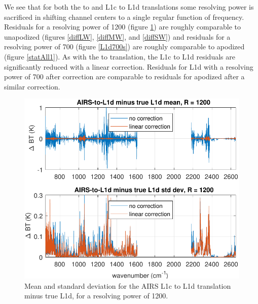 \documentclass[journal]{IEEEtran}
\begin{document}
We see that for both the {\airs} to {\cris} and L1c to L1d
translations some resolving power is sacrificed in shifting channel
centers to a single regular function of frequency.  Residuals for a
resolving power of 1200 (figure \ref{L1d1200}) are roughly
comparable to unapodized {\cris} (figures \ref{diffLW},
\ref{diffMW}, and \ref{diffSW}) and residuals for a resolving power
of 700 (figure \ref{L1d700s}) are roughly comparable to apodized
{\cris} (figure \ref{statAll1}).  As with the {\airs} to {\cris}
translation, the L1c to L1d residuals are significantly reduced with
a linear correction.  Residuals for L1d with a resolving power of
700 after correction are comparable to residuals for apodized
{\cris} after a similar correction.

\begin{figure} %
  \centering
  \includegraphics[width=\linewidth]{figures/L1d_cor1_1200.pdf}
  \caption{Mean and standard deviation for the AIRS L1c to L1d
    translation minus true L1d, for a resolving power of 1200.}
  \label{L1d1200}
\end{figure}
\end{document}

